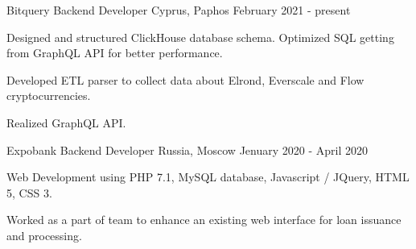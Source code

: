 

\begin{cventries}

  \cventry
    {Bitquery} %
    {Backend Developer} %
    {Cyprus, Paphos} %
    {February 2021 - present} %
    {
      \begin{cvitems} %
            \item {Designed and structured ClickHouse database schema. Optimized SQL getting from GraphQL API for better performance.}
          \item {Developed ETL parser to collect data about Elrond, Everscale and Flow cryptocurrencies.}
        \item {Realized GraphQL API.}
      \end{cvitems}
  }

  \cventry
    {Expobank} %
    {Backend Developer} %
    {Russia, Moscow} %
    {Jenuary 2020 - April 2020} %
    {
      \begin{cvitems} %
        \item {Web Development using PHP 7.1, MySQL database, Javascript / JQuery, HTML 5, CSS 3.}
        \item {Worked as a part of team to enhance an existing web interface for loan issuance and processing.}
      \end{cvitems}
  }

\end{cventries}
